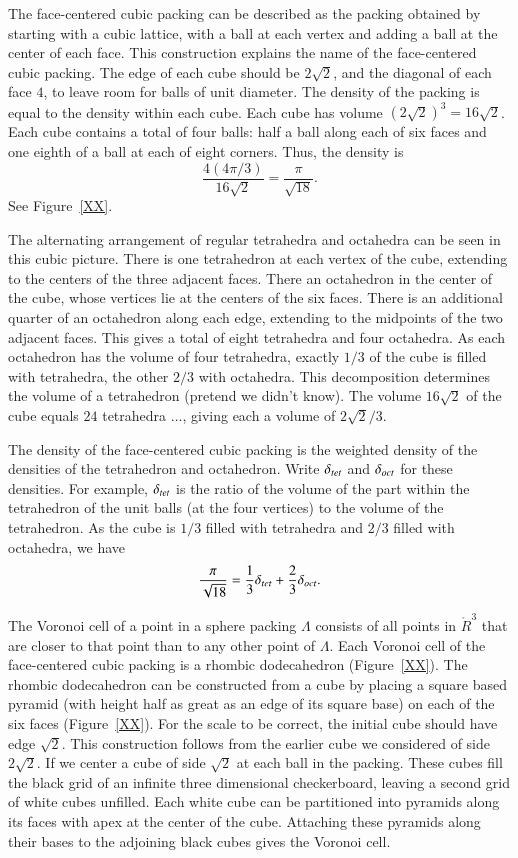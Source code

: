 The face-centered cubic packing can be described as the packing obtained
by starting with a cubic lattice, with a ball at each vertex and adding
a ball at the center of each face.  This construction explains the
name of the face-centered cubic packing.  The edge of each cube should be
$2\sqrt2$, and the diagonal of each face $4$, to leave room for balls
of unit diameter.  The density of the packing is equal to the density
within each cube.  Each cube has volume $(2\sqrt2)^3 = 16\sqrt2$.
Each cube contains a total of four balls:  half a ball along each
of six faces and one eighth of a ball at each of eight corners.
Thus, the density is
   $$
   \frac{   4 (4\pi/3)}{16\sqrt2} = \frac{\pi}{\sqrt{18}}.
   $$
See Figure~\ref{XX}.

The alternating arrangement of regular tetrahedra and octahedra can be
seen in this cubic picture.  There is one tetrahedron at each vertex
of the cube, extending to the centers of the three adjacent faces.
There an octahedron in the center of the cube, whose vertices lie
at the centers of the six faces.  There is an additional quarter of an
octahedron along each edge, extending to the midpoints of the two adjacent
faces.  This gives a total of eight tetrahedra and four octahedra.  
As each
octahedron has the volume of four tetrahedra, exactly $1/3$ of
the cube is filled with tetrahedra, the other $2/3$ with octahedra.
This decomposition determines the volume of a tetrahedron 
(pretend we didn't know). The volume $16\sqrt2$ 
of the cube equals $24$ tetrahedra $\ldots$, giving each a volume
of $2\sqrt{2}/3$.

The density of the face-centered cubic packing is the weighted density
of the densities of the tetrahedron and octahedron.  Write $\delta_{tet}$
and $\delta_{oct}$ for these densities.  For example, $\delta_{tet}$ is the ratio
of the volume
of the part within the tetrahedron of the unit balls (at the four vertices)
to the volume of the tetrahedron.  As the cube is $1/3$ filled  with
tetrahedra and $2/3$ filled with octahedra, we have
$$
  \frac{\pi}{\sqrt{18}} = \frac{1}{3}\delta_{tet} + \frac{2}{3}\delta_{oct}.
$$

The Voronoi cell of a point in a sphere packing $\Lambda$ consists of
all points in $\ring{R}^3$ that are closer to that point than to any
other point of $\Lambda$.
Each Voronoi cell of the face-centered cubic
packing is a rhombic dodecahedron (Figure~\ref{XX}).   %
The rhombic dodecahedron can be constructed from a cube by placing a
square based pyramid (with height half as great as an edge of its square
base) on each of the six faces (Figure~\ref{XX}).  %
For the scale to be correct, the
initial cube should have edge $\sqrt{2}$. This construction follows
from the earlier cube we considered of side $2\sqrt2$.  If we center
a cube of side $\sqrt2$ at each ball in the packing. These cubes fill
the black grid of an infinite three dimensional checkerboard,
leaving a second grid of white cubes unfilled.  Each
white cube can be partitioned into  pyramids along
its faces with apex at the center of the cube.  Attaching these pyramids
along their bases to the adjoining black cubes gives the Voronoi cell.

